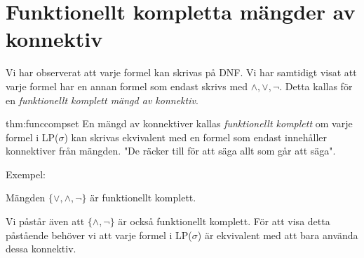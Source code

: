 \section{Funktionellt kompletta mängder av konnektiv}
\noindent Vi har observerat att varje formel kan skrivas på DNF. Vi har samtidigt visat att varje formel har en annan formel som endast skrivs med $\wedge, \vee, \neg$. Detta kallas för en \textit{funktionellt komplett mängd av konnektiv}.
\par\bigskip
\begin{theo}{thm:funccompset}
  En mängd av konnektiver kallas \textit{funktionellt komplett} om varje formel i LP($\sigma$) kan skrivas ekvivalent med en formel som endast innehåller konnektiver från mängden. "De räcker till för att säga allt som går att säga".
\end{theo}
\par\bigskip
\noindent Exempel:\par
\noindent Mängden $\{\vee,\wedge,\neg\}$ är funktionellt komplett.\par
\noindent Vi påstår även att $\{\wedge,\neg\}$ är också funktionellt komplett.  För att visa detta påstående behöver vi att varje formel i LP($\sigma$) är ekvivalent med att bara använda dessa konnektiv.
\par\bigskip

